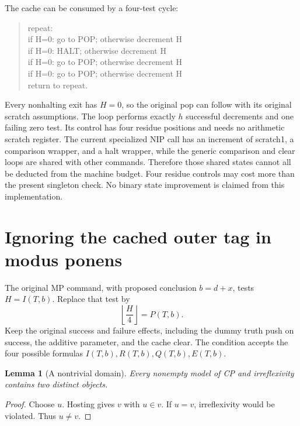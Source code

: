 \documentclass[11pt]{article}
\newtheorem{lemma}[theorem]{Lemma}
\begin{document}
The cache can be consumed by a four-test cycle:
\begin{quote}\ttfamily
repeat:\\
\quad if H=0: go to POP; otherwise decrement H\\
\quad if H=0: HALT; otherwise decrement H\\
\quad if H=0: go to POP; otherwise decrement H\\
\quad if H=0: go to POP; otherwise decrement H\\
\quad return to repeat.
\end{quote}
Every nonhalting exit has \(H=0\), so the original pop can follow with its
original scratch assumptions. The loop performs exactly \(h\) successful
decrements and one failing zero test. Its control has four residue positions
and needs no arithmetic scratch register. The current specialized NIP call has
an increment of scratch1, a comparison wrapper, and a halt wrapper, while the
generic comparison and clear loops are shared with other commands. Therefore
those shared states cannot all be deducted from the machine budget. Four
residue controls may cost more than the present singleton check. No binary
state improvement is claimed from this implementation.

\section{Ignoring the cached outer tag in modus ponens}

The original MP command, with proposed conclusion \(b=d+x\), tests
\(H=I(T,b)\). Replace that test by
\[
       \left\lfloor\frac H4\right\rfloor=P(T,b).        \tag{TMP}
\]
Keep the original success and failure effects, including the dummy truth push
on success, the additive parameter, and the cache clear. The condition accepts
the four possible formulas \(I(T,b),R(T,b),Q(T,b),E(T,b)\).

\begin{lemma}[A nontrivial domain]
Every nonempty model of CP and irreflexivity contains two distinct objects.
\end{lemma}
\begin{proof}
Choose \(u\). Hosting gives \(v\) with \(u\in v\). If \(u=v\), irreflexivity
would be violated. Thus \(u\ne v\).
\end{proof}
\end{document}
